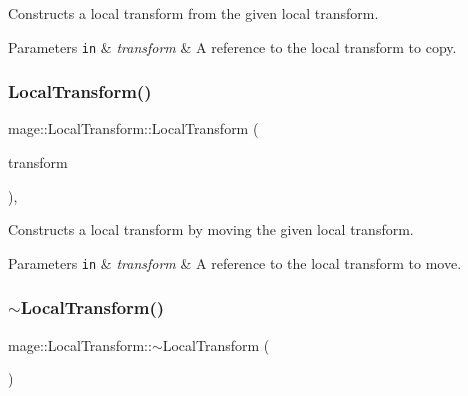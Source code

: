 Constructs a local transform from the given local transform.


\begin{DoxyParams}[1]{Parameters}
\mbox{\tt in}  & {\em transform} & A reference to the local transform to copy. \\
\hline
\end{DoxyParams}
\mbox{\label{classmage_1_1_local_transform_a89307f1f9229ba548fb7fb0c9dc64479}} 
\subsubsection{\texorpdfstring{Local\+Transform()}{LocalTransform()}\hspace{0.1cm}{\footnotesize\ttfamily [4/4]}}
{\footnotesize\ttfamily mage\+::\+Local\+Transform\+::\+Local\+Transform (\begin{DoxyParamCaption}\item[{\mbox{\hyperlink{classmage_1_1_local_transform}{Local\+Transform}} \&\&}]{transform }\end{DoxyParamCaption})\hspace{0.3cm}{\ttfamily [default]}, {\ttfamily [noexcept]}}

Constructs a local transform by moving the given local transform.


\begin{DoxyParams}[1]{Parameters}
\mbox{\tt in}  & {\em transform} & A reference to the local transform to move. \\
\hline
\end{DoxyParams}
\mbox{\label{classmage_1_1_local_transform_ada7472793bea34f1fbbea0856b124411}} 
\subsubsection{\texorpdfstring{$\sim$\+Local\+Transform()}{~LocalTransform()}}
{\footnotesize\ttfamily mage\+::\+Local\+Transform\+::$\sim$\+Local\+Transform (\begin{DoxyParamCaption}{ }\end{DoxyParamCaption})\hspace{0.3cm}{\ttfamily [default]}}

